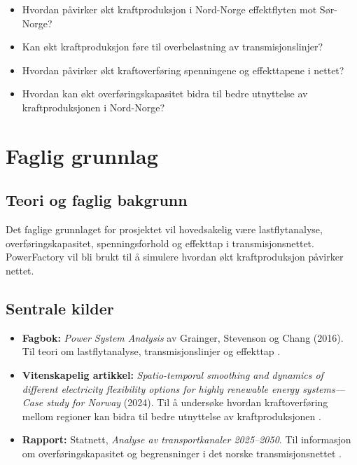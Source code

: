 \documentclass[12pt,a4paper]{article}
\begin{document}
\begin{itemize}
    \item Hvordan påvirker økt kraftproduksjon i Nord-Norge
    effektflyten mot Sør-Norge?

    \item Kan økt kraftproduksjon føre til overbelastning
    av transmisjonslinjer?

    \item Hvordan påvirker økt kraftoverføring spenningene
    og effekttapene i nettet?

    \item Hvordan kan økt overføringskapasitet bidra til bedre
    utnyttelse av kraftproduksjonen i Nord-Norge?
\end{itemize}


\section{Faglig grunnlag}

\subsection{Teori og faglig bakgrunn}

Det faglige grunnlaget for prosjektet vil hovedsakelig være
lastflytanalyse, overføringskapasitet, spenningsforhold og
effekttap i transmisjonsnettet. PowerFactory vil bli brukt
til å simulere hvordan økt kraftproduksjon påvirker nettet.

\subsection{Sentrale kilder}

\begin{itemize}
    \item \textbf{Fagbok:} \textit{Power System Analysis}
    av Grainger, Stevenson og Chang (2016).
    Til teori om lastflytanalyse, transmisjonslinjer
    og effekttap \cite{grainger2016}.

    \item \textbf{Vitenskapelig artikkel:}
    \textit{Spatio-temporal smoothing and dynamics of different
    electricity flexibility options for highly renewable energy
    systems---Case study for Norway} (2024).
    Til å undersøke hvordan kraftoverføring mellom regioner
    kan bidra til bedre utnyttelse av kraftproduksjonen
    \cite{grochowicz2024}.

    \item \textbf{Rapport:} Statnett,
    \textit{Analyse av transportkanaler 2025--2050}.
    Til informasjon om overføringskapasitet og begrensninger
    i det norske transmisjonsnettet \cite{statnett2025}.
\end{itemize}
\end{document}
